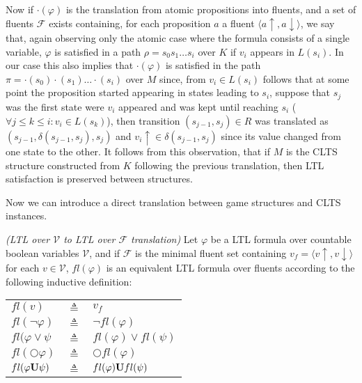 Now if $\cdot(\varphi)$ is the translation from atomic propositions into fluents, and a set of fluents $\mathcal{F}$ exists containing, for each proposition $a$ a fluent $\langle a\uparrow, a\downarrow \rangle$, we say that, again observing only the atomic case where the formula consists of a single variable, $\varphi$ is satisfied in a path $\rho=s_0 s_1\ldots s_i$ over $K$ if $v_i$ appears in $L(s_i)$. In our case this also implies that $\cdot(\varphi)$ is satisfied in the path $\pi=\cdot(s_0)\cdot(s_1)\ldots \cdot(s_i)$ over $M$ since, from $v_i \in L(s_i)$ follows that at some point the proposition started appearing in states leading to $s_i$, suppose that $s_j$ was the first state were $v_i$ appeared and was kept until reaching $s_i$ ($\forall j \leq k \leq i: v_i \in L(s_k)$), then transition $(s_{j-1},s_j) \in R$ was translated as $(s_{j-1}, \delta(s_{j-1},s_j),s_j)$ and $v_i\uparrow \in \delta(s_{j-1},s_j)$ since its value changed from one state to the other. It follows from this observation, that if $M$ is the CLTS structure constructed from $K$ following the previous translation, then LTL satisfaction is preserved between structures.

Now we can introduce a direct translation between game structures and CLTS instances.

\begin{definition}
	\label{def:fl_ltl} \emph{(LTL over $\mathcal{V}$ to LTL over $\mathcal{F}$ translation)} 
	Let $\varphi$ be a LTL formula over countable boolean variables $\mathcal{V}$, and if $\mathcal{F}$ is the minimal fluent set containing $v_f = \langle v\uparrow, v\downarrow \rangle$ for each $v \in \mathcal{V}$, $fl(\varphi)$ is an equivalent LTL formula over fluents according to the following inductive definition:\\
	
\begin{tabular}{ l c l }
	$fl(v)$ & $\triangleq$ & $v_f$\\	
	$fl(\neg \varphi)$ & $\triangleq$ & $\neg fl(\varphi)$\\
	$fl(\varphi \vee \psi$ & $\triangleq$ & $fl(\varphi) \vee fl(\psi)$\\
	$fl(\bigcirc \varphi)$ & $\triangleq$ & $\bigcirc fl(\varphi)$\\
	$fl(\varphi {\bf U} \psi)$ & $\triangleq$ & $fl(\varphi) {\bf U} fl(\psi)$\\
\end{tabular}	
\end{definition}


